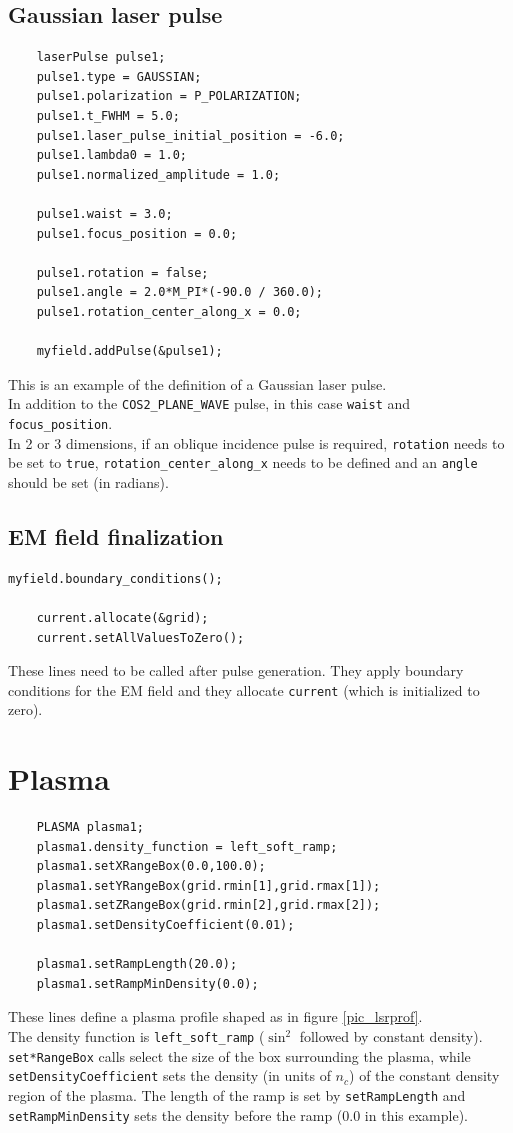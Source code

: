 \documentclass[11pt,a4paper]{report}
\begin{document}
\subsection{Gaussian laser pulse}
\begin{lstlisting}
	laserPulse pulse1;
	pulse1.type = GAUSSIAN;
	pulse1.polarization = P_POLARIZATION;
	pulse1.t_FWHM = 5.0;
	pulse1.laser_pulse_initial_position = -6.0;
	pulse1.lambda0 = 1.0;
	pulse1.normalized_amplitude = 1.0;
    
	pulse1.waist = 3.0;
	pulse1.focus_position = 0.0;
    
	pulse1.rotation = false;
	pulse1.angle = 2.0*M_PI*(-90.0 / 360.0);
	pulse1.rotation_center_along_x = 0.0;

	myfield.addPulse(&pulse1);
\end{lstlisting}
This is an example of the definition of a Gaussian laser pulse.\\
In addition to the \verb+COS2_PLANE_WAVE+ pulse, in this case \verb+waist+ and \verb+focus_position+.\\
In 2 or 3 dimensions, if an oblique incidence pulse is required, \verb+rotation+ needs to be set to \verb+true+,   \verb+rotation_center_along_x+ needs to be defined and an \verb+angle+ should be set (in radians).
\subsection{EM field finalization}
\begin{lstlisting}[backgroundcolor=\color{no_modify}]
	myfield.boundary_conditions();

	current.allocate(&grid);
	current.setAllValuesToZero();
\end{lstlisting}
These lines need to be called after pulse generation. They apply boundary conditions for the EM field and they allocate \verb+current+ (which is initialized to zero).
\section{Plasma}
\begin{lstlisting}
	PLASMA plasma1;
	plasma1.density_function = left_soft_ramp;      
	plasma1.setXRangeBox(0.0,100.0);    
	plasma1.setYRangeBox(grid.rmin[1],grid.rmax[1]);                 
	plasma1.setZRangeBox(grid.rmin[2],grid.rmax[2]);
	plasma1.setDensityCoefficient(0.01);

	plasma1.setRampLength(20.0);
	plasma1.setRampMinDensity(0.0);             
\end{lstlisting}
These lines define a plasma profile shaped as in figure \ref{pic_lsrprof}.\\
The density function is \verb+left_soft_ramp+ ($\sin^2$ followed by constant density). \verb+set*RangeBox+ calls select the size of the box surrounding the plasma, while \verb+setDensityCoefficient+ sets the density (in units of $n_c$) of the constant density region of the plasma. The length of the ramp is set by \verb+setRampLength+ and \verb+setRampMinDensity+ sets the density before the ramp (0.0 in this example).
\end{document}
